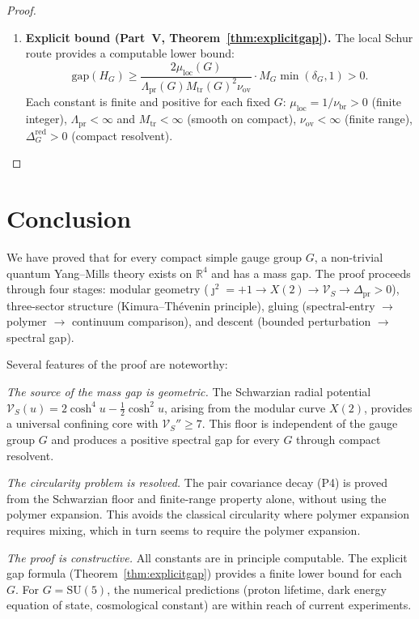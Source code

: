 \documentclass[12pt]{article}
\theoremstyle{plain}
\theoremstyle{definition}
\numberwithin{equation}{section}
\newcommand{\R}{\mathbb{R}}
\newcommand{\pr}{\mathrm{pr}}
\newcommand{\loc}{\mathrm{loc}}
\newcommand{\red}{\mathrm{red}}
\newcommand{\br}{\mathrm{br}}
\newcommand{\ov}{\mathrm{ov}}
\newcommand{\tr}{\mathrm{tr}}
\begin{document}
\begin{proof}
\begin{enumerate}[label=\textbf{Step~\arabic*.}]
\item \textbf{Explicit bound (Part~V, Theorem~\ref{thm:explicitgap}).}
The local Schur route provides a computable lower bound:
\begin{equation}
\mathrm{gap}(H_G)\geq\frac{2\mu_{\loc}(G)}{\Lambda_{\pr}(G)M_{\tr}(G)^2\nu_{\ov}}\cdot M_G\min(\delta_G,1)>0.
\end{equation}
Each constant is finite and positive for each fixed $G$: $\mu_{\loc}=1/\nu_{\br}>0$ (finite integer), $\Lambda_{\pr}<\infty$ and $M_{\tr}<\infty$ (smooth on compact), $\nu_{\ov}<\infty$ (finite range), $\Delta_G^{\red}>0$ (compact resolvent).\qedhere
\end{enumerate}
\end{proof}


\section*{Conclusion}

We have proved that for every compact simple gauge group $G$, a non-trivial quantum Yang--Mills theory exists on $\R^4$ and has a mass gap.  The proof proceeds through four stages: modular geometry ($\jmath^2=+1\to X(2)\to\mathcal{V}_S\to\Delta_{\pr}>0$), three-sector structure (Kimura--Th\'evenin principle), gluing (spectral-entry $\to$ polymer $\to$ continuum comparison), and descent (bounded perturbation $\to$ spectral gap).

Several features of the proof are noteworthy:

\emph{The source of the mass gap is geometric.}  The Schwarzian radial potential $\mathcal{V}_S(u)=2\cosh^4 u-\frac{1}{2}\cosh^2 u$, arising from the modular curve $X(2)$, provides a universal confining core with $\mathcal{V}_S''\geq 7$.  This floor is independent of the gauge group $G$ and produces a positive spectral gap for every $G$ through compact resolvent.

\emph{The circularity problem is resolved.}  The pair covariance decay (P4) is proved from the Schwarzian floor and finite-range property alone, without using the polymer expansion.  This avoids the classical circularity where polymer expansion requires mixing, which in turn seems to require the polymer expansion.

\emph{The proof is constructive.}  All constants are in principle computable.  The explicit gap formula (Theorem~\ref{thm:explicitgap}) provides a finite lower bound for each $G$.  For $G=\mathrm{SU}(5)$, the numerical predictions (proton lifetime, dark energy equation of state, cosmological constant) are within reach of current experiments.
\end{document}
